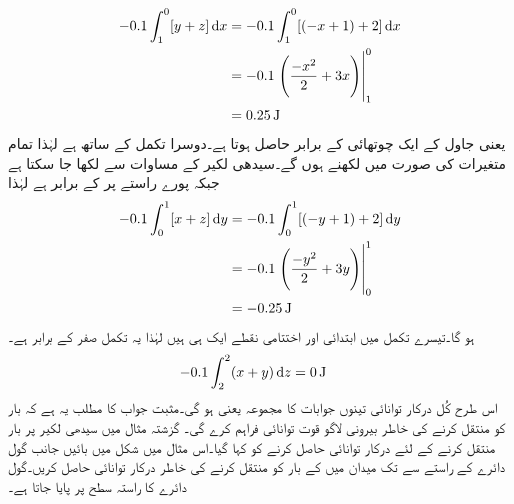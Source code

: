 \begin{align*}
-0.1 \int_{1}^{0} [y+z]\dif x &=-0.1 \int_{1}^{0} [(-x+1)+2] \dif x\\
&=-0.1\left.\left(\frac{-x^2}{2}+3x\right) \right|_{1}^{0}\\
&=\SI{0.25}{\joule}
\end{align*}
یعنی جاول کے ایک چوتھائی کے برابر حاصل ہوتا ہے۔دوسرا تکمل  کے ساتھ ہے لہٰذا تمام متغیرات   کی صورت میں لکھنے ہوں گے۔سیدھی لکیر کے مساوات سے   لکھا جا سکتا ہے جبکہ  پورے راستے پر   کے برابر ہے لہٰذا
\begin{align*}
-0.1 \int_{0}^{1} [x+z]\dif y &=-0.1 \int_{0}^{1} [(-y+1)+2] \dif y\\
&=-0.1 \left.\left(\frac{-y^2}{2}+3y\right) \right|_{0}^{1}\\
&=\SI{-0.25}{\joule}
\end{align*}
ہو گا۔تیسرے تکمل میں ابتدائی اور اختتامی نقطے ایک ہی ہیں لہٰذا یہ تکمل صفر کے برابر ہے۔ 
\begin{align*}
-0.1 \int_{2}^{2} (x+y) \dif z &=\SI{0}{\joule}
\end{align*}
اس طرح کُل درکار توانائی تینوں جوابات کا مجموعہ یعنی   ہو گی۔مثبت جواب کا مطلب یہ ہے کہ بار کو منتقل کرنے کی خاطر بیرونی لاگو قوت توانائی فراہم کرے گی۔ 
گزشتہ مثال میں سیدھی لکیر پر بار منتقل کرنے کے لئے درکار توانائی حاصل کرنے کو کہا گیا۔اس مثال میں شکل  میں بائیں جانب گول دائرے کے راستے  سے  تک  میدان میں  کے بار کو منتقل کرنے کی خاطر درکار توانائی حاصل کریں۔گول دائرے کا راستہ  سطح پر پایا جاتا ہے۔

